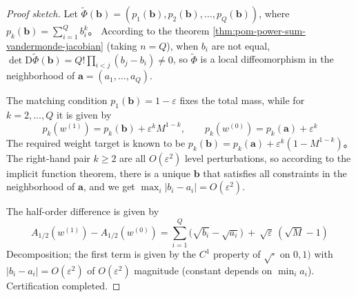 \begin{proof}[Proof sketch]
Let \(\widetilde\Phi(\mathbf b)=(p_1(\mathbf b),p_2(\mathbf b),\dots,p_Q(\mathbf b))\), where
\(
p_k(\mathbf b)=\sum_{i=1}^{Q}b_i^k
\)。
According to the theorem \ref{thm:pom-power-sum-vandermonde-jacobian} (taking \(n=Q\)), when \(b_i\) are not equal,
\(
\det \mathrm{D}\widetilde\Phi(\mathbf b)=Q!\prod_{i<j}(b_j-b_i)\neq 0
\), so \(\widetilde\Phi\) is a local diffeomorphism in the neighborhood of \(\mathbf a=(a_1,\dots,a_Q)\).
\par
The matching condition \(p_1(\mathbf b)=1-\varepsilon\) fixes the total mass, while for \(k=2,\dots,Q\) it is given by
\[
p_k(w^{(1)})=p_k(\mathbf b)+\varepsilon^k M^{1-k},\qquad
p_k(w^{(0)})=p_k(\mathbf a)+\varepsilon^k
\]
The required weight target is known to be
\(
p_k(\mathbf b)=p_k(\mathbf a)+\varepsilon^k(1-M^{1-k})
\)。
The right-hand pair \(k\ge 2\) are all \(O(\varepsilon^2)\) level perturbations, so according to the implicit function theorem, there is a unique \(\mathbf b\) that satisfies all constraints in the neighborhood of \(\mathbf a\), and we get \(\max_i|b_i-a_i|=O(\varepsilon^2)\).
\par
The half-order difference is given by
\[
A_{1/2}(w^{(1)})-A_{1/2}(w^{(0)})
=\sum_{i=1}^{Q}\bigl(\sqrt{b_i}-\sqrt{a_i}\bigr)
\ +\ \sqrt{\varepsilon}\,(\sqrt{M}-1)
\]
Decomposition; the first term is given by the \(C^1\) property of \(\sqrt{\cdot}\) on \(0,1)\) with \(|b_i-a_i|=O(\varepsilon^2)\) of \(O(\varepsilon^2)\) magnitude (constant depends on \(\min_i a_i\)). Certification completed.
\end{proof}


